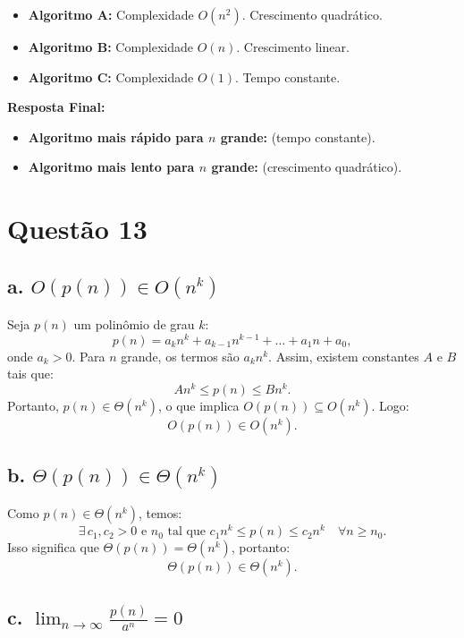 \begin{itemize}
    \item \textbf{Algoritmo A:} Complexidade \(O(n^2)\). Crescimento quadrático.
    \item \textbf{Algoritmo B:} Complexidade \(O(n)\). Crescimento linear.
    \item \textbf{Algoritmo C:} Complexidade \(O(1)\). Tempo constante.
\end{itemize}

\vspace{5pt}

\textbf{Resposta Final:}
\begin{itemize}
    \item \textbf{Algoritmo mais rápido para \(n\) grande:}  (tempo constante).
    \item \textbf{Algoritmo mais lento para \(n\) grande:}  (crescimento quadrático).
\end{itemize}

\section*{Questão 13}



\subsection*{a. \( O(p(n)) \in O(n^k) \)}

Seja \( p(n) \) um polinômio de grau \( k \):
\[
p(n) = a_kn^k + a_{k-1}n^{k-1} + \dots + a_1n + a_0,
\]
onde \( a_k > 0 \). Para \( n \) grande, os termos são \( a_kn^k \). Assim, existem constantes \( A \) e \( B \) tais que:
\[
An^k \leq p(n) \leq Bn^k.
\]
Portanto, \( p(n) \in \Theta(n^k) \), o que implica \( O(p(n)) \subseteq O(n^k) \). Logo:
\[
\boxed{O(p(n)) \in O(n^k)}.
\]

\subsection*{b. \( \Theta(p(n)) \in \Theta(n^k) \)}

Como \( p(n) \in \Theta(n^k) \), temos:
\[
\exists \, c_1, c_2 > 0 \text{ e } n_0 \text{ tal que } c_1n^k \leq p(n) \leq c_2n^k \quad \forall n \geq n_0.
\]
Isso significa que \( \Theta(p(n)) = \Theta(n^k) \), portanto:
\[
\boxed{\Theta(p(n)) \in \Theta(n^k)}.
\]

\subsection*{c. \( \lim_{n \to \infty} \frac{p(n)}{a^n} = 0 \)}

